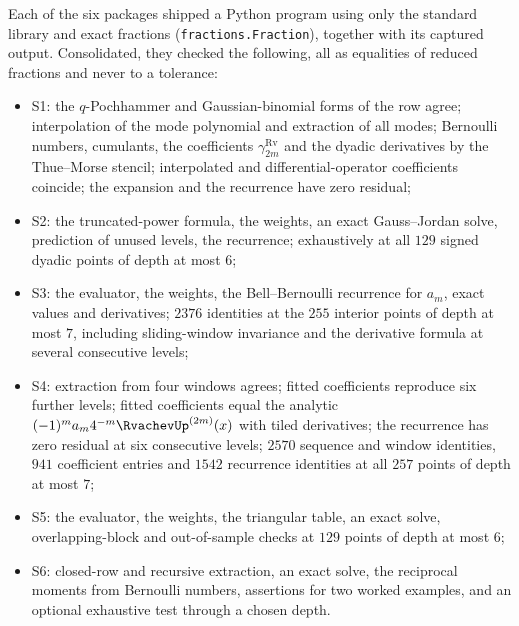 \documentclass[11pt,oneside]{article}
\theoremstyle{plain}
\theoremstyle{definition}
\theoremstyle{remark}
\newcommand{\am}[1]{a_{#1}}                                 %
\begin{document}
Each of the six packages shipped a Python program using only the standard
library and exact fractions (\texttt{fractions.Fraction}), together with its
captured output.
Consolidated, they checked the following, all as equalities of reduced
fractions and never to a tolerance:
\begin{itemize}
\item S1: the $q$-Pochhammer and Gaussian-binomial forms of the row agree;
 interpolation of the mode polynomial and extraction of all modes;
 Bernoulli numbers, cumulants, the coefficients $\gamma^{\mathrm{Rv}}_{2m}$
 and the dyadic derivatives by the Thue--Morse stencil; interpolated and
 differential-operator coefficients coincide; the expansion and the
 recurrence have zero residual;
\item S2: the truncated-power formula, the weights, an exact Gauss--Jordan
 solve, prediction of unused levels, the recurrence; exhaustively at all
 $129$ signed dyadic points of depth at most $6$;
\item S3: the evaluator, the weights, the Bell--Bernoulli recurrence for
 $\am{m}$, exact values and derivatives; $2376$ identities at the $255$
 interior points of depth at most $7$, including sliding-window
 invariance and the derivative formula at several consecutive levels;
\item S4: extraction from four windows agrees; fitted coefficients
 reproduce six further levels; fitted coefficients equal the analytic
 $(-1)^{m}\am{m}4^{-m}\RvachevUp^{(2m)}(x)$ with tiled derivatives; the
 recurrence has zero residual at six consecutive levels; $2570$
 sequence and window identities, $941$ coefficient entries and $1542$
 recurrence identities at all $257$ points of depth at most $7$;
\item S5: the evaluator, the weights, the triangular table, an exact solve,
 overlapping-block and out-of-sample checks at $129$ points of depth at
 most $6$;
\item S6: closed-row and recursive extraction, an exact solve, the reciprocal
 moments from Bernoulli numbers, assertions for two worked examples, and an
 optional exhaustive test through a chosen depth.
\end{itemize}
\end{document}
